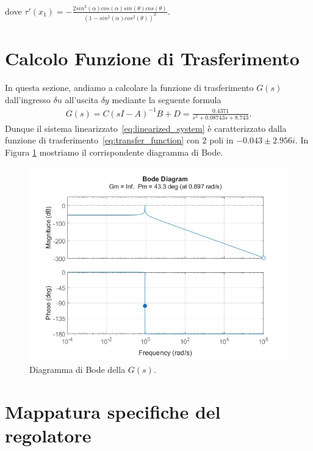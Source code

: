 \documentclass[a4paper, 11pt]{article}
\begin{document}
	dove $\tau'(x_1)= - \frac{2sin^2(\alpha)cos(\alpha)sin(\theta)cos(\theta)} 
	{(1-sin^2(\alpha)cos^2(\theta))^2}$.
	\section{Calcolo Funzione di Trasferimento}
	
	In questa sezione, andiamo a calcolare la funzione di trasferimento $G(s)$ dall'ingresso $\delta u$ all'uscita $\delta y$ mediante la seguente formula 
	\begin{align}\label{eq:transfer_function}
		G(s) = C(sI - A)^{-1}B+D = \frac{0.4371}{s^2 + 0.08743 s + 8.743}.
	\end{align}
	Dunque il sistema linearizzato~\eqref{eq:linearized_system} è caratterizzato dalla funzione di trasferimento~\eqref{eq:transfer_function} con $2$ poli in $-0.043 \pm 2.956i$. In Figura \ref{fig:G} mostriamo il corrispondente diagramma di Bode. 
	
	\begin{figure}[h]
		\centering
		\includegraphics[width=0.5\linewidth]{BodeDiagramWithouthPatch2025.jpg}
		\caption{Diagramma di Bode della $G(s)$.}
		\label{fig:G}
	\end{figure}
	
	\newcommand{\dB}{\text{dB}}
	
	\section{Mappatura specifiche del regolatore}
	\label{sec:specifications}
	
\end{document}
